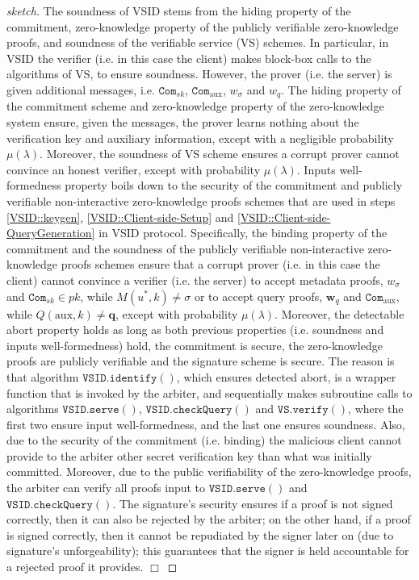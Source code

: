 
\begin{proof}[sketch] The soundness  of VSID  stems  from the hiding property of the commitment, zero-knowledge property of the publicly verifiable zero-knowledge proofs, and soundness of  the  verifiable service (VS) schemes. In particular, in VSID the verifier (i.e. in this case the client) makes block-box calls to the algorithms of   VS, to ensure soundness. However, the prover (i.e.  the server) is given  additional messages, i.e.   $\mathtt{Com}_{\scriptscriptstyle sk}$,  $\mathtt{Com}_{\scriptscriptstyle \text{aux}}$, $w_{\scriptscriptstyle\sigma}$ and $w_{\scriptscriptstyle q}$. The hiding property of the commitment scheme and zero-knowledge property of the zero-knowledge system ensure, given the messages, the prover learns nothing about the verification key and auxiliary information, except with a negligible probability $\mu(\lambda)$. Moreover, the soundness of VS scheme ensures a corrupt prover cannot convince an honest verifier, except with  probability $\mu(\lambda)$.   Inputs well-formedness property boils down to the security of the commitment and publicly verifiable non-interactive zero-knowledge proofs   schemes that are used in steps \ref{VSID::keygen}, \ref{VSID::Client-side-Setup} and \ref{VSID::Client-side-QueryGeneration} in VSID protocol. Specifically,  the binding property of the commitment and the soundness of the publicly verifiable non-interactive zero-knowledge proofs schemes  ensure that a corrupt prover (i.e. in this case the client) cannot convince a verifier (i.e. the server) to accept metadata proofs, $w_{\scriptscriptstyle\sigma}$ and $\mathtt{Com}_{\scriptscriptstyle sk}\in pk$, while  $M(u^{\scriptscriptstyle *},k)\neq \sigma $ or to accept query proofs, $\bm{w}_{\scriptscriptstyle q}$ and $\mathtt{Com}_{\scriptscriptstyle \text{aux}}$, while $Q(\text{aux},k)\neq \bm{q}$, except with  probability $\mu(\lambda)$.  Moreover, the detectable abort property holds as long as both previous properties (i.e. soundness and inputs well-formedness) hold, the commitment is secure, the zero-knowledge proofs are publicly verifiable and the signature scheme is secure. The reason is that algorithm $\mathtt{VSID.identify}()$, which ensures detected abort, is a wrapper function that is invoked by the arbiter, and  sequentially makes subroutine calls to algorithms  $\mathtt{VSID.serve}()$,  $\mathtt{VSID.checkQuery}()$ and $\mathtt{VS.verify}()$,   where the first two ensure input well-formedness, and the last one ensures soundness. Also, due to the security of the commitment (i.e. binding) the malicious client cannot provide to the arbiter other secret verification key than what  was initially committed. Moreover, due to the public verifiability of the zero-knowledge proofs, the arbiter can verify all proofs input to $\mathtt{VSID.serve}()$ and $\mathtt{VSID.checkQuery}()$. The signature's security ensures if a proof is not signed correctly, then it can also be rejected by the arbiter; on the other hand, if a proof is signed correctly, then  it cannot be repudiated by the signer later on (due to signature's unforgeability); this guarantees that the signer is held accountable for a rejected proof it provides.
  \hfill\(\Box\)\end{proof}
  
  
  
  
  
  